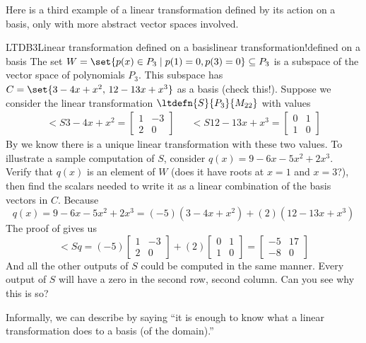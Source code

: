 %
Here is a third example of a linear transformation defined by its action on a basis, only with more abstract vector spaces involved.
%
\begin{example}{LTDB3}{Linear transformation defined on a basis}{linear transformation!defined on a basis}
The set $W=\set{p(x)\in P_3\mid p(1)=0, p(3)=0}\subseteq P_3$ is a subspace of the vector space of polynomials $P_3$.  This subspace has $C=\set{3-4x+x^2,\,12-13x+x^3}$ as a basis (check this!).  Suppose we consider the linear transformation $\ltdefn{S}{P_3}{M_{22}}$ with values
%
\begin{align*}
\lt{S}{3-4x+x^2}=\begin{bmatrix}1&-3\\2&0\end{bmatrix}&&
\lt{S}{12-13x+x^3}=\begin{bmatrix}0&1\\1&0\end{bmatrix}
\end{align*}
%
By  we know there is a unique linear transformation with these two values.  To illustrate a sample computation of $S$, consider $q(x)=9-6x-5x^2+2x^3$.  Verify that $q(x)$ is an element of $W$ (does it have roots at $x=1$ and $x=3$?), then find the scalars needed to write it as a linear combination of the basis vectors in $C$.  Because
%
\begin{equation*}
q(x)=9-6x-5x^2+2x^3=(-5)(3-4x+x^2)+(2)(12-13x+x^3)
\end{equation*}
%
The proof of  gives us
%
\begin{equation*}
\lt{S}{q}=(-5)\begin{bmatrix}1&-3\\2&0\end{bmatrix}
+
(2)\begin{bmatrix}0&1\\1&0\end{bmatrix}
=
\begin{bmatrix}-5&17\\-8&0\end{bmatrix}
\end{equation*}
%
And all the other outputs of $S$ could be computed in the same manner.  Every output of $S$ will have a zero in the second row, second column.  Can you see why this is so?
%
\end{example}
%
Informally, we can describe  by saying ``it is enough to know what a linear transformation does to a basis (of the domain).''
